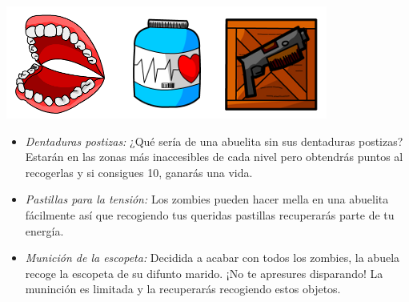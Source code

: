 \begin{center}
 	\includegraphics[scale=0.6]{items.png}
\end{center}

\begin{itemize}
	\item \emph{Dentaduras postizas:} ¿Qué sería de una abuelita sin sus dentaduras postizas? Estarán en las zonas más inaccesibles de cada nivel pero obtendrás puntos al recogerlas y si consigues 10, ganarás una vida.
	\item \emph{Pastillas para la tensión:} Los zombies pueden hacer mella en una abuelita fácilmente así que recogiendo tus queridas pastillas recuperarás parte de tu energía.
	\item \emph{Munición de la escopeta:} Decidida a acabar con todos los zombies, la abuela recoge la escopeta de su difunto marido. ¡No te apresures disparando! La muninción es limitada y la recuperarás recogiendo estos objetos.
\end{itemize}
